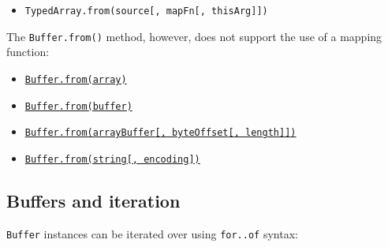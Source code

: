 \begin{itemize}
\tightlist
\item
  \texttt{TypedArray.from(source{[},\ mapFn{[},\ thisArg{]}{]})}
\end{itemize}

The \texttt{Buffer.from()} method, however, does not support the use of
a mapping function:

\begin{itemize}
\tightlist
\item
  \hyperref[static-method-bufferfromarray]{\texttt{Buffer.from(array)}}
\item
  \hyperref[static-method-bufferfrombuffer]{\texttt{Buffer.from(buffer)}}
\item
  \hyperref[static-method-bufferfromarraybuffer-byteoffset-length]{\texttt{Buffer.from(arrayBuffer{[},\ byteOffset{[},\ length{]}{]})}}
\item
  \hyperref[static-method-bufferfromstring-encoding]{\texttt{Buffer.from(string{[},\ encoding{]})}}
\end{itemize}

\subsection{Buffers and iteration}\label{buffers-and-iteration}

\texttt{Buffer} instances can be iterated over using \texttt{for..of}
syntax:

\begin{Shaded}
\begin{Highlighting}[]
\NormalTok{ \{ }\NormalTok{ \} } \OperatorTok{;}

\OperatorTok{=} \NormalTok{([}\OperatorTok{,} \OperatorTok{,} \NormalTok{])}\OperatorTok{;}

\NormalTok{ (}
  \OperatorTok{;}
\NormalTok{\}}
\end{Highlighting}
\end{Shaded}

